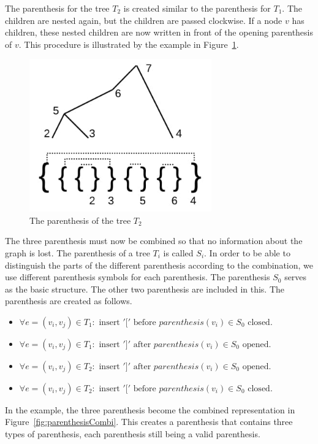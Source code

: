 \documentclass[a4paper]{scrartcl}
\begin{document}
The parenthesis for the tree $T_2$ is created similar to the parenthesis for $T_1$. The children are nested again, but the children are passed clockwise. If a node $v$ has  children, these nested children are now written in front of the opening parenthesis of $v$. This procedure is illustrated by the example in Figure~\ref{fig:parenthesisThree}.


\begin{figure}[h]
	\centering
	\includegraphics[width=0.7\textwidth]{img/parenthesisThree}
	\caption{The parenthesis of the  tree $T_2$}
	\label{fig:parenthesisThree}
\end{figure}

The three parenthesis must now be combined so that no information about the graph is lost. The parenthesis of a tree $T_i$ is called $S_i$. In order to be able to distinguish the parts of the different parenthesis according to the combination, we use different parenthesis symbols for each parenthesis. The parenthesis $S_0$ serves as the basic structure. The other two parenthesis are included in this. The parenthesis are created as follows.

\begin{itemize}
	\item $\forall e=(v_i,v_j)\in T_1: \text{ insert } '[' \text{ before } parenthesis(v_i)\in S_0 \text{ closed.}$
	\item $\forall e=(v_i,v_j)\in T_1: \text{ insert } ']' \text{ after } parenthesis(v_i)\in S_0 \text{ opened.}$
	\item $\forall e=(v_i,v_j)\in T_2: \text{ insert } ']' \text{ after } parenthesis(v_i)\in S_0 \text{ opened.}$
	\item $\forall e=(v_i,v_j)\in T_2: \text{ insert } '[' \text{ before } parenthesis(v_i)\in S_0 \text{ closed.}$
\end{itemize}
In the example, the three parenthesis become the combined representation in Figure~\ref{fig:parenthesisCombi}.
This creates a parenthesis that contains three types of parenthesis, each parenthesis still being a valid parenthesis.
\end{document}
